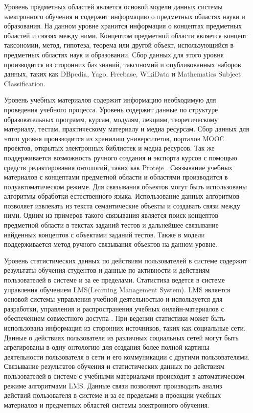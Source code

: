 Уровень предметных областей является основой модели данных системы электронного обучения и содержит информацию о предметных областях науки и образования. На данном уровне хранится информация о концептах предметных областей и связях между ними. Концептом предметной области является концепт таксономии, метод, гипотеза, теорема или другой объект, использующийся в предметных областях наук и образовании. Сбор данных для этого уровня производится из сторонних баз знаний, таксономий и опубликованных наборов данных, таких как DBpedia, Yago, Freebase, WikiData и Mathematics Subject Classification. 

Уровень учебных материалов содержит информацию необходимую для проведения учебного процесса. Уровень содержит данные по структуре  образовательных программ, курсам, модулям, лекциям, теоретическому материалу, тестам, практическому материалу и медиа ресурсам. Сбор данных для этого уровня производится из хранилищ университетов, порталов MOOC проектов, открытых электронных библиотек и медиа ресурсов. Так же поддерживается возможность ручного создания и экспорта курсов с помощью средств редактирования онтологий, таких как Proteje \cite{jain2013ontology}. Связывание учебных материалов с концептами предметной области и областями производится в полуавтоматическом режиме. Для связывания объектов могут быть использованы алгоритмы обработки естественного языка. Использование данных алгоритмов позволяет извлекать из текста семантические объекты и создавать связи между ними. Одним из примеров такого связывания является поиск концептов предметной области в текстах заданий тестов и дальнейшее связывание найденных концептов с объектами заданий тестов. Также в модели поддерживается метод ручного связывания объектов на данном уровне.

Уровень статистических данных по действиям пользователей в системе содержит результаты обучения студентов и  данные по активности и действиям пользователей в системе и за ее пределами. Статистика ведется в системе управления обучением LMS(Learning Management System). LMS является основой системы управления учебной деятельностью и используется для разработки, управления и распространения учебных онлайн-материалов с обеспечением совместного доступа \cite{mahnegar2012learning}. При ведении статистики может быть использована информация из сторонних источников, таких как социальные сети. Данные о действиях пользователя из различных социальных сетей могут быть агрегированы в одну онтологию для создания более полной картины деятельности пользователя в сети и его коммуникации с другими пользователями. Связывание результатов обучения и статистических данных по действиям пользователей в системе с учебными материалами происходит в автоматическом режиме алгоритмами LMS. Данные связи позволяют производить анализ действий пользователя в системе и за ее пределами в проекции учебных материалов и предметных областей системы электронного обучения.


